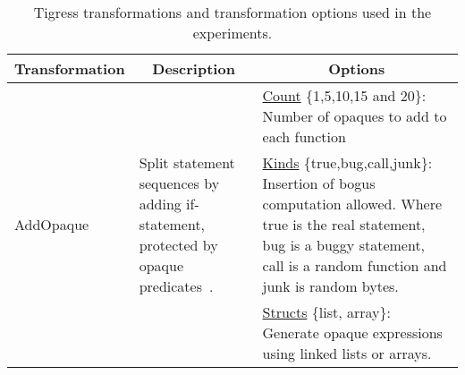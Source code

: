 

\begin{table*}[p]
\caption{Tigress transformations and transformation options used in the experiments.}
\label{tab:tigress}
\begin{tabular}{|p{2.25cm}|p{4cm}|p{11cm}|}
\hline
\multicolumn{1}{|c|}{Transformation} & \multicolumn{1}{c|}{Description}                                                                                                                                                                                                                                                                        & \multicolumn{1}{c|}{Options}                                                                                                                                                                                                                                                                                                                             \\ \hline
\multirow{3}{*}{AddOpaque}           & \multirow{3}{4cm}{Split statement sequences by adding if-statement, protected by opaque predicates~\cite{collberg98manufacturing}.} & \underline{Count} \{1,5,10,15 and 20\}: Number of opaques to add to each function                                                                                                                                                                                                                                                                                             \\ \cline{3-3} 
                                     &                                                                                                                                                                                                                                                                                                         & \underline{Kinds} \{true,bug,call,junk\}: Insertion of bogus computation allowed. Where true is the real statement, bug is a buggy statement, call is a random function and junk is random bytes.                                                                                                                                                                     \\ \cline{3-3} 
                                     &                                                                                                                                                                                                                                                                                                         & \underline{Structs} \{list, array\}: Generate opaque expressions using linked lists or arrays.                                                                                                                                                                                                                                                                       \\ \hline

\end{tabular}
\end{table*}

